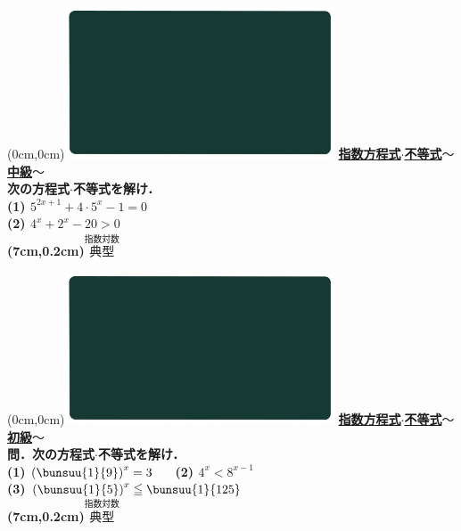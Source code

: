 \documentclass[10pt,
fleqn,
dvipdfmx,
uplatex
]{jsarticle}
\begin{document}
\newpage

\at(0cm,0cm){\includegraphics[width=8cm,bb=0 0 1920 1080]{./youtube/thumbnails/templates/smart_background/指数対数.jpeg}}
{\color{orange}\bf\boldmath\Large\underline{指数方程式$\cdot$不等式$〜$中級$〜$}}\vspace{0.3zw}\\
\LARGE 
\bf\boldmath 次の方程式$\cdot$不等式を解け．\vspace{0.3zw}\\
(1)  $5^{2x+1}+4\cdot 5^x-1=0$\\
(2)  $4^x+2^x-{20}>0$\\

\at(7cm,0.2cm){\small\color{bradorange}$\overset{\text{指数対数}}{\text{典型}}$}

\newpage

\at(0cm,0cm){\includegraphics[width=8cm,bb=0 0 1920 1080]{./youtube/thumbnails/templates/smart_background/指数対数.jpeg}}
{\color{orange}\bf\boldmath\Large\underline{指数方程式$\cdot$不等式$〜$初級$〜$}}\vspace{0.3zw}\\
\Large 
\bf\boldmath 問．次の方程式$\cdot$不等式を解け．\vspace{0.3zw}\\
(1)  $\left(\bunsuu{1}{9}\right)^x=3$\ \ \ 
(2)  $4^x<8^{x-1}$\\
(3)  $\left(\bunsuu{1}{5}\right)^x\leqq \bunsuu{1}{{{125}}}$\\

\at(7cm,0.2cm){\small\color{bradorange}$\overset{\text{指数対数}}{\text{典型}}$}
\end{document}
